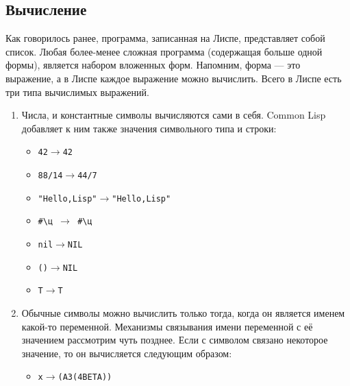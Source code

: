 \documentclass[a4paper, 12pt, titlepage, twoside]{article}
\begin{document}
\subsection{Вычисление}
Как говорилось ранее, программа, записанная на Лиспе, представляет собой список. Любая более-менее сложная программа (содержащая больше одной формы), является набором вложенных форм. Напомним, форма --- это выражение, а в Лиспе каждое выражение можно вычислить. Всего в Лиспе есть три типа вычислимых выражений.
\begin{enumerate}
\item Числа, и константные символы вычисляются сами в себя. Common Lisp добавляет к ним также значения символьного типа и строки:
  \begin{itemize}
  \item[] \begin{alltt}42 \(\longrightarrow\) 42\end{alltt}
  \item[] \begin{alltt}88/14 \(\longrightarrow\) 44/7\end{alltt}
  \item[] \begin{alltt}"Hello, Lisp" \(\longrightarrow\) "Hello, Lisp"\end{alltt}
  \item[] \texttt{\#\textbackslash{}ц $\longrightarrow$ \#\textbackslash{}ц}
  \item[] \begin{alltt}nil \(\longrightarrow\) NIL\end{alltt}
  \item[] \begin{alltt}() \(\longrightarrow\) NIL\end{alltt}
  \item[] \begin{alltt}T \(\longrightarrow\) T\end{alltt}
  \end{itemize}
\item Обычные символы можно вычислить только тогда, когда он является именем какой-то переменной. Механизмы связывания имени переменной с её значением рассмотрим чуть позднее. Если с символом связано некоторое значение, то он вычисляется следующим образом:
  \begin{itemize}
  \item[] \begin{alltt} x \(\longrightarrow\) (A 3 (4 BETA))\end{alltt}

\end{itemize}
\end{enumerate}
\end{document}

